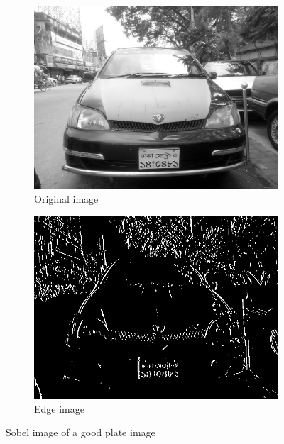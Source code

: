 \begin{figure}
\begin{subfigure}{0.5\textwidth}
    \centering
    \includegraphics[width=0.9\linewidth]{./img/experiment/stage.2/good3}
    \caption{Original image}
\end{subfigure}
\begin{subfigure}{0.5\textwidth}
    \centering
    \includegraphics[width=0.9\linewidth]{./img/experiment/stage.3/good3}
    \caption{Edge image}
\end{subfigure}
\caption{Sobel image of a good plate image}
\label{fig:MatchedResult2}
\end{figure}


